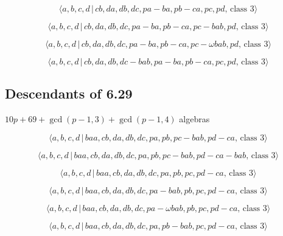 \documentclass[10pt]{article}
\begin{document}
\begin{equation}
\langle a,b,c,d\,|\,cb,da,db,dc,pa-ba,pb-ca,pc,pd,\,\text{class }3\rangle 
\tag{7.3991}
\end{equation}

\begin{equation}
\langle a,b,c,d\,|\,cb,da,db,dc,pa-ba,pb-ca,pc-bab,pd,\,\text{class }3\rangle
\tag{7.3992}
\end{equation}

\begin{equation}
\langle a,b,c,d\,|\,cb,da,db,dc,pa-ba,pb-ca,pc-\omega bab,pd,\,\text{class }%
3\rangle  \tag{7.3993}
\end{equation}

\begin{equation}
\langle a,b,c,d\,|\,cb,da,db,dc-bab,pa-ba,pb-ca,pc,pd,\,\text{class }3\rangle
\tag{7.3994}
\end{equation}

\subsection{Descendants of 6.29}

$10p+69+\gcd (p-1,3)+\gcd (p-1,4)$ algebras

\begin{equation}
\langle a,b,c,d\,|\,baa,cb,da,db,dc,pa,pb,pc-bab,pd-ca,\,\text{class }%
3\rangle  \tag{7.3995}
\end{equation}

\begin{equation}
\langle a,b,c,d\,|\,baa,cb,da,db,dc,pa,pb,pc-bab,pd-ca-bab,\,\text{class }%
3\rangle  \tag{7.3996}
\end{equation}

\begin{equation}
\langle a,b,c,d\,|\,baa,cb,da,db,dc,pa,pb,pc,pd-ca,\,\text{class }3\rangle 
\tag{7.3997}
\end{equation}

\begin{equation}
\langle a,b,c,d\,|\,baa,cb,da,db,dc,pa-bab,pb,pc,pd-ca,\,\text{class }%
3\rangle  \tag{7.3998}
\end{equation}

\begin{equation}
\langle a,b,c,d\,|\,baa,cb,da,db,dc,pa-\omega bab,pb,pc,pd-ca,\,\text{class }%
3\rangle  \tag{7.3999}
\end{equation}

\begin{equation}
\langle a,b,c,d\,|\,baa,cb,da,db,dc,pa,pb-bab,pc,pd-ca,\,\text{class }%
3\rangle  \tag{7.4000}
\end{equation}
\end{document}

